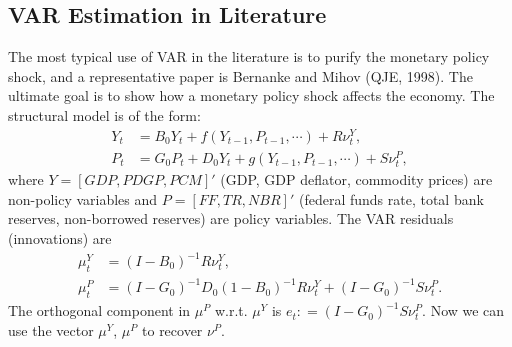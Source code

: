 \documentclass[12pt]{article}
\begin{document}
\subsection{VAR Estimation in Literature}
The most typical use of VAR in the literature is to purify the monetary policy shock, and a representative paper is Bernanke and Mihov (QJE, 1998). The ultimate goal is to show how a monetary policy shock affects the economy. The structural model is of the form:
\begin{align*}
    Y_t &= B_0 Y_t + f(Y_{t-1}, P_{t-1}, \cdots) + R \nu^Y_t,\\
    P_t &= G_0 P_t + D_0 Y_t + g(Y_{t-1}, P_{t-1}, \cdots) + S \nu^P_t,
\end{align*}
where $Y = [GDP, PDGP, PCM]'$ (GDP, GDP deflator, commodity prices) are non-policy variables and $P = [FF, TR, NBR]'$ (federal funds rate, total bank reserves, non-borrowed reserves) are policy variables. The VAR residuals (innovations) are
\begin{align*}
    \mu^Y_t &= (I - B_0)^{-1} R \nu^Y_t,\\
    \mu^P_t &= (I - G_0)^{-1} D_0 (1-B_0)^{-1} R \nu^Y_t + (I - G_0)^{-1} S \nu^P_t.
\end{align*}
The orthogonal component in $\mu^P$ w.r.t. $\mu^Y$ is $e_t : = (I - G_0)^{-1} S \nu^P_t$. Now we can use the vector $\mu^Y$, $\mu^P$ to recover $\nu^P$.
\end{document}
